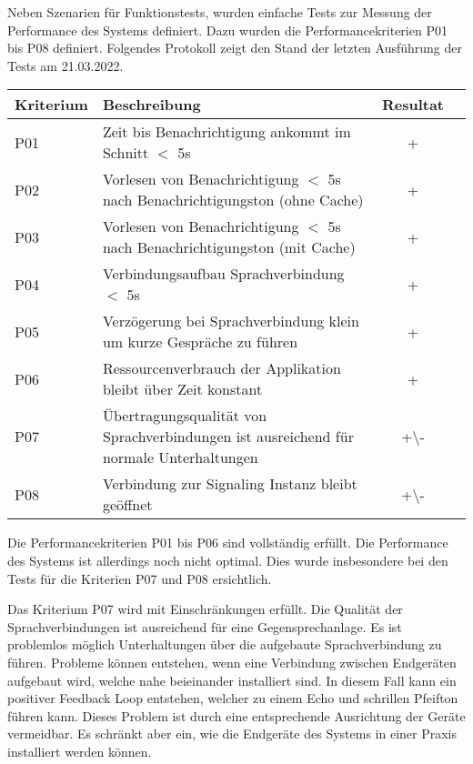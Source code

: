 Neben Szenarien für Funktionstests, wurden einfache Tests zur Messung der Performance des Systems definiert.
Dazu wurden die Performancekriterien P01 bis P08 definiert.
Folgendes Protokoll zeigt den Stand der letzten Ausführung der Tests am 21.03.2022.

\begin{table}[h]
    \centering
    \begin{tabular}{|l|p{11cm}|c|c|}
        \hline
        \textbf{Kriterium} & \textbf{Beschreibung} & \textbf{Resultat} \\
        \hline
        P01         & Zeit bis Benachrichtigung ankommt im Schnitt $<$ 5s & +\\
        \hline
        P02         & Vorlesen von Benachrichtigung $<$ 5s nach Benachrichtigungston (ohne Cache) & +\\
        \hline
        P03         & Vorlesen von Benachrichtigung $<$ 5s nach Benachrichtigungston (mit Cache) & +\\
        \hline
        P04         & Verbindungsaufbau Sprachverbindung $<$ 5s  & +\\
        \hline
        P05         & Verzögerung bei Sprachverbindung klein um kurze Gespräche zu führen & +\\
        \hline
        P06         & Ressourcenverbrauch der Applikation bleibt über Zeit konstant & +\\
        \hline
        P07         & Übertragungsqualität von Sprachverbindungen ist ausreichend für normale Unterhaltungen & +\textbackslash- \\
        \hline
        P08         & Verbindung zur Signaling Instanz bleibt geöffnet & +\textbackslash- \\
        \hline
    \end{tabular}\label{tab:testplan_performance}
\end{table}

Die Performancekriterien P01 bis P06 sind vollständig erfüllt.
Die Performance des Systems ist allerdings noch nicht optimal.
Dies wurde insbesondere bei den Tests für die Kriterien P07 und P08 ersichtlich.

Das Kriterium P07 wird mit Einschränkungen erfüllt.
Die Qualität der Sprachverbindungen ist ausreichend für eine Gegensprechanlage.
Es ist problemlos möglich Unterhaltungen über die aufgebaute Sprachverbindung zu führen.
Probleme können entstehen, wenn eine Verbindung zwischen Endgeräten aufgebaut wird, welche nahe beieinander installiert sind.
In diesem Fall kann ein positiver Feedback Loop entstehen, welcher zu einem Echo und schrillen Pfeifton führen kann.
Dieses Problem ist durch eine entsprechende Ausrichtung der Geräte vermeidbar.
Es schränkt aber ein, wie die Endgeräte des Systems in einer Praxis installiert werden können.

